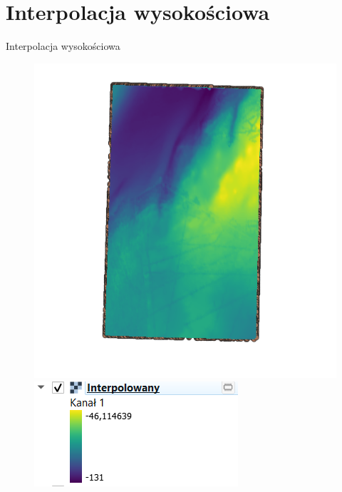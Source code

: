 \documentclass{beamer}
\begin{document}
\section{Interpolacja wysokościowa}
\begin{frame}{Interpolacja wysokościowa}
	\begin{figure}
		\centering
		\begin{minipage}{0.7\textwidth}
			\centering
			\includegraphics[width=\textwidth]{interpolacja_wysokosc_qgis.png}
		\end{minipage}
		\begin{minipage}{0.2\textwidth}
			\centering
			\includegraphics[width=\textwidth]{skala.png}
		\end{minipage}
	\end{figure}

\end{frame}
\end{document}
